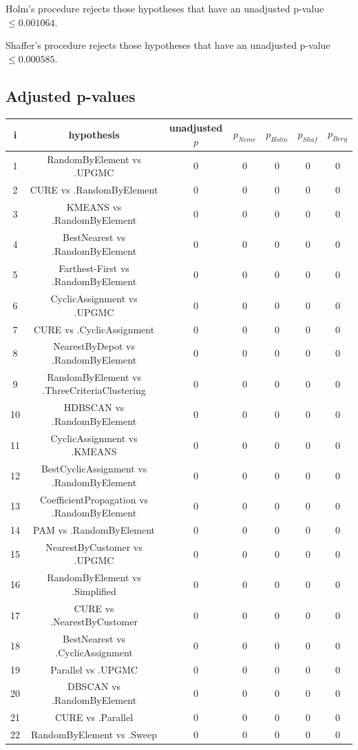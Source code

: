 \documentclass[a4paper,10pt]{article}
\begin{document}
\begin{landscape}
Holm's procedure rejects those hypotheses that have an unadjusted p-value $\le0.001064$.

Shaffer's procedure rejects those hypotheses that have an unadjusted p-value $\le0.000585$.

\pagebreak

\subsection{Adjusted p-values}

\begin{table}[!htp]
\centering\scriptsize
\begin{tabular}{ccccccc}
i&hypothesis&unadjusted $p$&$p_{Neme}$&$p_{Holm}$&$p_{Shaf}$&$p_{Berg}$\\
\hline1&RandomByElement vs .UPGMC&0&0&0&0&0\\
2&CURE vs .RandomByElement&0&0&0&0&0\\
3&KMEANS vs .RandomByElement&0&0&0&0&0\\
4&BestNearest vs .RandomByElement&0&0&0&0&0\\
5&Farthest-First vs .RandomByElement&0&0&0&0&0\\
6&CyclicAssignment vs .UPGMC&0&0&0&0&0\\
7&CURE vs .CyclicAssignment&0&0&0&0&0\\
8&NearestByDepot vs .RandomByElement&0&0&0&0&0\\
9&RandomByElement vs .ThreeCriteriaClustering&0&0&0&0&0\\
10&HDBSCAN vs .RandomByElement&0&0&0&0&0\\
11&CyclicAssignment vs .KMEANS&0&0&0&0&0\\
12&BestCyclicAssignment vs .RandomByElement&0&0&0&0&0\\
13&CoefficientPropagation vs .RandomByElement&0&0&0&0&0\\
14&PAM vs .RandomByElement&0&0&0&0&0\\
15&NearestByCustomer vs .UPGMC&0&0&0&0&0\\
16&RandomByElement vs .Simplified&0&0&0&0&0\\
17&CURE vs .NearestByCustomer&0&0&0&0&0\\
18&BestNearest vs .CyclicAssignment&0&0&0&0&0\\
19&Parallel vs .UPGMC&0&0&0&0&0\\
20&DBSCAN vs .RandomByElement&0&0&0&0&0\\
21&CURE vs .Parallel&0&0&0&0&0\\
22&RandomByElement vs .Sweep&0&0&0&0&0\\

\end{tabular}
\end{table}
\end{landscape}
\end{document}
